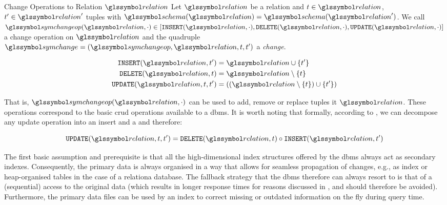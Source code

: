 \begin{definition}[label=definition:change]{Change Operations to Relation $\relation$}{}
    Let $\relation$ be a relation and $t \in \relation$, $t^{\prime} \in \relation^{\prime}$ tuples with $\schema(\relation) = \schema(\relation^{\prime})$. We call $\symchangeop(\relation,\cdot) \in [ \mathtt{INSERT}(\relation, \cdot), \mathtt{DELETE}(\relation, \cdot), \mathtt{UPDATE}(\relation, \cdot) ]$ a change operation on $\relation$ and the quadruple $\symchange = (\symchangeop, \relation, t, t^{\prime})$ a \emph{change}.

    \begin{align*}
        \mathtt{INSERT}(\relation, t^{\prime}) &= \relation \cup \lbrace t^{\prime} \rbrace \\
        \mathtt{DELETE}(\relation, t ) &= \relation \setminus \lbrace t \rbrace \\
        \mathtt{UPDATE}(\relation, t, t^{\prime}) &= ((\relation \setminus \lbrace t \rbrace) \cup \lbrace t^{\prime} \rbrace)\\
    \end{align*}

    That is, $\symchangeop(\relation,\cdot)$ can be used to add, remove or replace tuples it $\relation$. These operations correspond to the basic \acrshort{crud} operations available to a \acrshort{dbms}. It is worth noting that formally, according to , we can decompose any update operation into an insert and a and therefore:

    \begin{equation*}
    \mathtt{UPDATE}(\relation, t, t^{\prime}) = \mathtt{DELETE}(\relation, t ) \circ \mathtt{INSERT}(\relation, t^{\prime})
    \end{equation*}
\end{definition}

The first basic assumption and prerequisite is that all the high-dimensional index structures offered by the \acrshort{dbms} always act as secondary indexes. Consequently, the primary data is always organised in a way that allows for seamless propagation of changes, e.g., as index or heap-organised tables in the case of a relationa database. The fallback strategy that the \acrshort{dbms} therefore can always resort to is that of a (sequential) access to the original data (which results in longer response times for reasons discussed in , and should therefore be avoided). Furthermore, the primary data files can be used by an index to correct missing or outdated information on the fly during query time.

